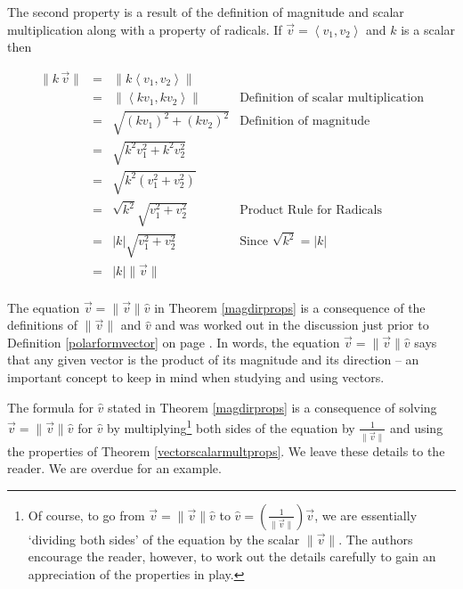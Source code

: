 \documentclass{ximera}
\begin{document}
 

The second property is a result of the definition of magnitude and scalar multiplication along with a property of radicals. If $\overrightarrow{v} = \left< v_1 ,v_2\right>$ and $k$ is a scalar then 

\[ \begin{array}{rcll}

\| k \, \overrightarrow{v} \| & = & \| k \left< v_1, v_2\right> \| & \\   
									 & = & \| \left<kv_1,kv_2\right>\| & \text{Definition of scalar multiplication} \\   
									 & = & \sqrt{\left(kv_1\right)^2 + \left(kv_2\right)^2} & \text{Definition of magnitude} \\   
									 & = & \sqrt{k^2v_1^2 + k^2v_2^2} & \\  
									 & = & \sqrt{k^2(v_1^2+v_2^2)} & \\   
									 & = & \sqrt{k^2} \sqrt{v_1^2+v_2^2} & \text{Product Rule for Radicals} \\   
									 & = & |k| \sqrt{v_1^2+v_2^2} & \text{Since $\sqrt{k^2} = |k|$} \\
									 & = & |k| \| \overrightarrow{v} \| & \\
\end{array} \]

 

The equation $\overrightarrow{v} = \| \overrightarrow{v} \| \hat{v}$ in Theorem \ref{magdirprops} is a consequence of the definitions of $\| \overrightarrow{v} \|$ and $\hat{v}$ and was worked out in the discussion just prior to Definition \ref{polarformvector} on page \pageref{polarformvectorsection}.  In words, the equation $\overrightarrow{v} = \| \overrightarrow{v} \| \hat{v}$  says that any given vector is the product of its magnitude and its direction -- an important concept to keep in mind when studying and using vectors. 

 

The formula for   $\hat{v}$ stated  in Theorem \ref{magdirprops}  is a consequence of solving $\overrightarrow{v} = \| \overrightarrow{v} \| \hat{v}$  for $\hat{v}$ by multiplying\footnote{Of course, to go from $\overrightarrow{v} = \| \overrightarrow{v} \| \hat{v}$ to $\hat{v} = \left( \frac{1}{\|\overrightarrow{v}\|}\right) \overrightarrow{v}$, we are essentially `dividing both sides' of the equation by the scalar $\| \overrightarrow{v} \|$.  The authors encourage the reader, however, to work out the details carefully to gain an appreciation of the properties in play.} both sides of the equation by $\frac{1}{\| \overrightarrow{v} \|}$ and using the properties of Theorem \ref{vectorscalarmultprops}.  We leave these details to the reader. We are overdue for an example.
\end{document}
